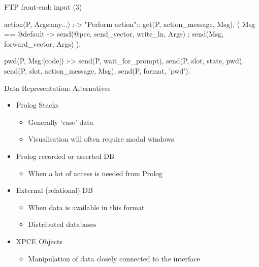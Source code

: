 \begin{sli}{FTP front-end: input (3)}
\begin{code}
action(P, Args:any...) :->
        "Perform action"::
        get(P, action_message, Msg),
        (   Msg == @default
        ->  send(@pce, send_vector, write_ln, Args)
        ;   send(Msg, forward_vector, Args)
        ).

pwd(P, Msg:[code]) :->
        send(P, wait_for_prompt),
        send(P, slot, state, pwd),
        send(P, slot, action_message, Msg),
        send(P, format, 'pwd\n').
\end{code}

\noindent
\end{sli}




\begin{sli}{Data Representation: Alternatives}

\begin{itemize}
    \item Prolog Stacks
    \begin{itemize}
	\item Generally `case' data
	\item Visualisation will often require modal windows
    \end{itemize}
    \item Prolog recorded or asserted DB
    \begin{itemize}
	\item When a lot of access is needed from Prolog
    \end{itemize}
    \item External (relational) DB
    \begin{itemize}
	\item When data is available in this format
	\item Distributed databases
    \end{itemize}
    \item XPCE Objects
    \begin{itemize}
	\item Manipulation of data closely connected to the interface    
    \end{itemize}
\end{itemize}
\end{sli}

